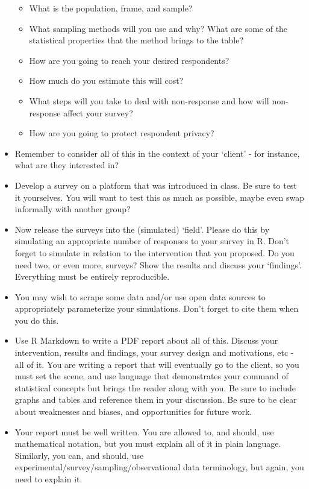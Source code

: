 \documentclass[
]{book}
\providecommand{\tightlist}{%
  \setlength{\itemsep}{0pt}\setlength{\parskip}{0pt}}
\begin{document}
\begin{itemize}
  \begin{itemize}
  \tightlist
  \item
    What is the population, frame, and sample?
  \item
    What sampling methods will you use and why? What are some of the statistical properties that the method brings to the table?
  \item
    How are you going to reach your desired respondents?
  \item
    How much do you estimate this will cost?
  \item
    What steps will you take to deal with non-response and how will non-response affect your survey?
  \item
    How are you going to protect respondent privacy?
  \end{itemize}
\item
  Remember to consider all of this in the context of your `client' - for instance, what are they interested in?
\item
  Develop a survey on a platform that was introduced in class. Be sure to test it yourselves. You will want to test this as much as possible, maybe even swap informally with another group?
\item
  Now release the surveys into the (simulated) `field'. Please do this by simulating an appropriate number of responses to your survey in R. Don't forget to simulate in relation to the intervention that you proposed. Do you need two, or even more, surveys? Show the results and discuss your `findings'. Everything must be entirely reproducible.
\item
  You may wish to scrape some data and/or use open data sources to appropriately parameterize your simulations. Don't forget to cite them when you do this.
\item
  Use R Markdown to write a PDF report about all of this. Discuss your intervention, results and findings, your survey design and motivations, etc - all of it. You are writing a report that will eventually go to the client, so you must set the scene, and use language that demonstrates your command of statistical concepts but brings the reader along with you. Be sure to include graphs and tables and reference them in your discussion. Be sure to be clear about weaknesses and biases, and opportunities for future work.
\item
  Your report must be well written. You are allowed to, and should, use mathematical notation, but you must explain all of it in plain language. Similarly, you can, and should, use experimental/survey/sampling/observational data terminology, but again, you need to explain it.

\end{itemize}
\end{document}
